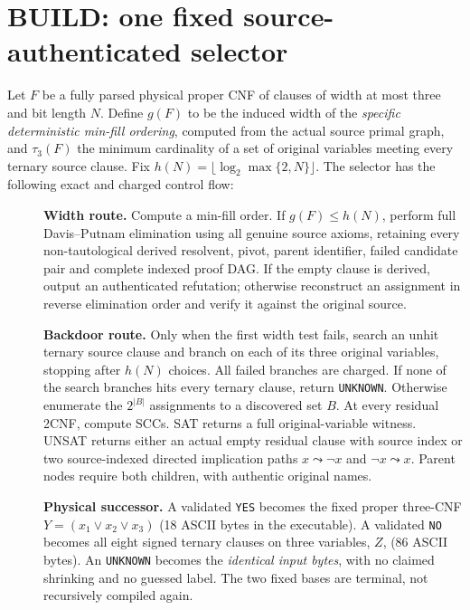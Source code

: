 \documentclass[11pt]{article}
\begin{document}
\section{BUILD: one fixed source-authenticated selector}
Let $F$ be a fully parsed physical proper CNF of clauses of width at most three and bit length $N$. Define $g(F)$ to be the induced width of the \emph{specific deterministic min-fill ordering}, computed from the actual source primal graph, and $\tau_3(F)$ the minimum cardinality of a set of original variables meeting every ternary source clause. Fix $h(N)=\lfloor\log_2\max\{2,N\}\rfloor$. The selector has the following exact and charged control flow:
\begin{description}
\item[] \textbf{Width route.} Compute a min-fill order. If $g(F)\le h(N)$, perform full Davis--Putnam elimination using all genuine source axioms, retaining every non-tautological derived resolvent, pivot, parent identifier, failed candidate pair and complete indexed proof DAG. If the empty clause is derived, output an authenticated refutation; otherwise reconstruct an assignment in reverse elimination order and verify it against the original source.
\item[] \textbf{Backdoor route.} Only when the first width test fails, search an unhit ternary source clause and branch on each of its three original variables, stopping after $h(N)$ choices. All failed branches are charged. If none of the search branches hits every ternary clause, return \texttt{UNKNOWN}. Otherwise enumerate the $2^{|B|}$ assignments to a discovered set $B$. At every residual 2CNF, compute SCCs. SAT returns a full original-variable witness. UNSAT returns either an actual empty residual clause with source index or two source-indexed directed implication paths $x\leadsto\neg x$ and $\neg x\leadsto x$. Parent nodes require both children, with authentic original names.
\item[] \textbf{Physical successor.} A validated \texttt{YES} becomes the fixed proper three-CNF $Y=(x_1\vee x_2\vee x_3)$ (18 ASCII bytes in the executable). A validated \texttt{NO} becomes all eight signed ternary clauses on three variables, $Z$, (86 ASCII bytes). An \texttt{UNKNOWN} becomes the \emph{identical input bytes}, with no claimed shrinking and no guessed label. The two fixed bases are terminal, not recursively compiled again.
\end{description}
\end{document}
